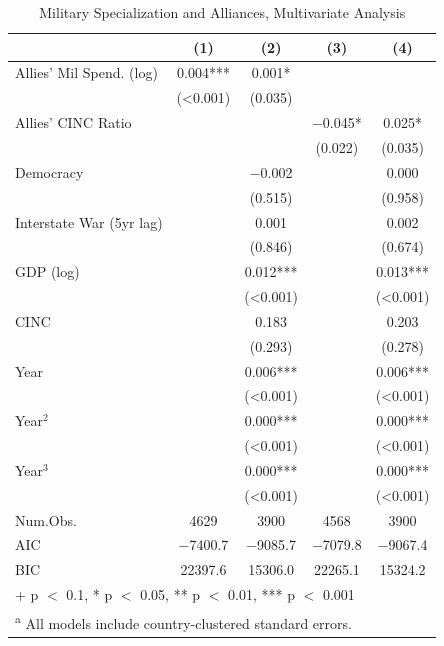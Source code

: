 \documentclass[
  12,
  letterpaper,
  DIV=11,
  numbers=noendperiod]{scrartcl}
\begin{document}
\hypertarget{tbl-results}{}
\begin{table}
\caption{\label{tbl-results}Military Specialization and Alliances, Multivariate Analysis }\tabularnewline

\centering
\begin{tabular}[t]{lcccc}
\toprule
  & (1) & (2) & (3) & (4)\\
\midrule
Allies' Mil Spend. (log) & \num{0.004}*** & \num{0.001}* &  & \\
 & (\num{<0.001}) & (\num{0.035}) &  & \\
Allies' CINC Ratio &  &  & \num{-0.045}* & \num{0.025}*\\
 &  &  & (\num{0.022}) & (\num{0.035})\\
Democracy &  & \num{-0.002} &  & \num{0.000}\\
 &  & (\num{0.515}) &  & (\num{0.958})\\
Interstate War (5yr lag) &  & \num{0.001} &  & \num{0.002}\\
 &  & (\num{0.846}) &  & (\num{0.674})\\
GDP (log) &  & \num{0.012}*** &  & \num{0.013}***\\
 &  & (\num{<0.001}) &  & \vphantom{3} (\num{<0.001})\\
CINC &  & \num{0.183} &  & \num{0.203}\\
 &  & (\num{0.293}) &  & (\num{0.278})\\
Year &  & \num{0.006}*** &  & \num{0.006}***\\
 &  & (\num{<0.001}) &  & \vphantom{2} (\num{<0.001})\\
Year$^2$ &  & \num{0.000}*** &  & \num{0.000}***\\
 &  & (\num{<0.001}) &  & \vphantom{1} (\num{<0.001})\\
Year$^3$ &  & \num{0.000}*** &  & \num{0.000}***\\
 &  & (\num{<0.001}) &  & (\num{<0.001})\\
\midrule
Num.Obs. & \num{4629} & \num{3900} & \num{4568} & \num{3900}\\
AIC & \num{-7400.7} & \num{-9085.7} & \num{-7079.8} & \num{-9067.4}\\
BIC & \num{22397.6} & \num{15306.0} & \num{22265.1} & \num{15324.2}\\
\bottomrule
\multicolumn{5}{l}{\rule{0pt}{1em}+ p $<$ 0.1, * p $<$ 0.05, ** p $<$ 0.01, *** p $<$ 0.001}\\
\multicolumn{5}{l}{\textsuperscript{a} All models include country-clustered standard errors.}\\
\end{tabular}
\end{table}
\end{document}
